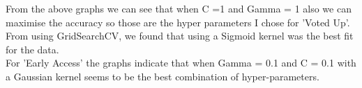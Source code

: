 \documentclass[11pt]{article} %
\begin{document}
\begin{figure}[h]
\centering
{}
\qquad
{}
\end{figure}

From the above graphs we can see that when C =1 and Gamma = 1 also we can maximise the accuracy so those are the hyper parameters I chose for 'Voted Up'.  From using GridSearchCV,  we found that using a Sigmoid kernel was the best fit for the data. 
\\ For 'Early Access' the graphs indicate that when Gamma = 0.1 and C = 0.1 with a Gaussian kernel seems to be the best combination of hyper-parameters. 
\end{document}
